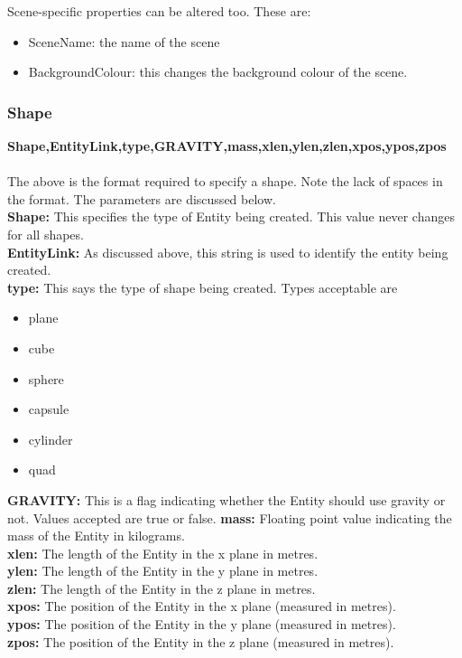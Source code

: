 \documentclass[a4paper,12pt]{article}
\begin{document}
Scene-specific properties can be altered too. These are:
\begin{itemize}
\item SceneName: the name of the scene
\item BackgroundColour: this changes the background colour of the scene.
\end{itemize}

\subsubsection{Shape}

\textbf{Shape,EntityLink,type,GRAVITY,mass,xlen,ylen,zlen,xpos,ypos,zpos}\\\\
The above is the format required to specify a shape. Note the lack of spaces in the format. The parameters are discussed below.\\
\textbf{Shape:} This specifies the type of Entity being created. This value never changes for all shapes.\\
\textbf{EntityLink:} As discussed above, this string is used to identify the entity being created.\\
\textbf{type:} This says the type of shape being created. Types acceptable are 
\begin{itemize}
\item plane
\item cube
\item sphere
\item capsule
\item cylinder
\item quad
\end{itemize}
\textbf{GRAVITY:} This is a flag indicating whether the Entity should use gravity or not. Values accepted are true or false.
\newline
\textbf{mass:} Floating point value indicating the mass of the Entity in kilograms.\\
\textbf{xlen:} The length of the Entity in the x plane in metres.\\
\textbf{ylen:} The length of the Entity in the y plane in metres.\\
\textbf{zlen:} The length of the Entity in the z plane in metres.\\
\textbf{xpos:} The position of the Entity in the x plane (measured in metres).\\
\textbf{ypos:} The position of the Entity in the y plane (measured in metres).\\
\textbf{zpos:} The position of the Entity in the z plane (measured in metres).\\
\end{document}
